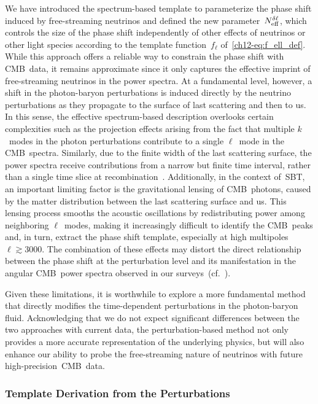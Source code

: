 We have introduced the spectrum-based template to parameterize the phase shift induced by free-streaming neutrinos and defined the new parameter~$N_\mathrm{eff}^{\delta\ell}$, which controls the size of the phase shift independently of other effects of neutrinos or other light species according to the template function~$f_\ell$ of~\eqref{ch12-eq:f_ell_def}. While this approach offers a reliable way to constrain the phase shift with CMB~data, it remains approximate since it only captures the effective imprint of free-streaming neutrinos in the power spectra. At a fundamental level, however, a shift in the photon-baryon perturbations is induced directly by the neutrino perturbations as they propagate to the surface of last scattering and then to us. In this sense, the effective spectrum-based description overlooks certain complexities such as the projection effects arising from the fact that multiple $k$~modes in the photon perturbations contribute to a single $\ell$~mode in the CMB~spectra. Similarly, due to the finite width of the last scattering surface, the power spectra receive contributions from a narrow but finite time interval, rather than a single time slice at recombination~\cite{Hu:1997hp, Pan:2016zla}. Additionally, in the context of~SBT, an important limiting factor is the gravitational lensing of CMB~photons, caused by the matter distribution between the last scattering surface and us. This lensing process smooths the acoustic oscillations by redistributing power among neighboring $\ell$~modes, making it increasingly difficult to identify the CMB~peaks and, in turn, extract the phase shift template, especially at high multipoles $\ell \gtrsim 3000$. The combination of these effects may distort the direct relationship between the phase shift at the perturbation level and its manifestation in the angular CMB~power spectra observed in our surveys~(cf.~\cite{Pan:2016zla}).\medskip

Given these limitations, it is worthwhile to explore a more fundamental method that directly modifies the time-dependent perturbations in the photon-baryon fluid. Acknowledging that we do not expect significant differences between the two approaches with current data, the perturbation-based method not only provides a more accurate representation of the underlying physics, but will also enhance our ability to probe the free-streaming nature of neutrinos with future high-precision~CMB~data.


\subsubsection{Template Derivation from the Perturbations}
\label{ch12-sec:perturbation-template}

